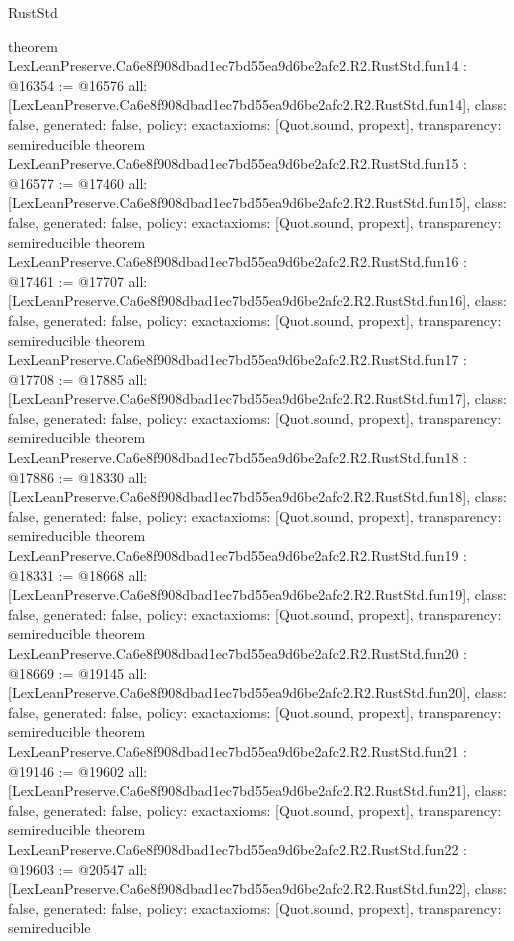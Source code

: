 \begin{lexlean}{RustStd}
\begin{coremodule}
{}
theorem LexLeanPreserve.Ca6e8f908dbad1ec7bd55ea9d6be2afc2.R2.RustStd.fun14 : @16354 := @16576 {
  all: [LexLeanPreserve.Ca6e8f908dbad1ec7bd55ea9d6be2afc2.R2.RustStd.fun14],
  class: false,
  generated: false,
  policy: exact{axioms: [Quot.sound, propext]},
  transparency: semireducible
}
theorem LexLeanPreserve.Ca6e8f908dbad1ec7bd55ea9d6be2afc2.R2.RustStd.fun15 : @16577 := @17460 {
  all: [LexLeanPreserve.Ca6e8f908dbad1ec7bd55ea9d6be2afc2.R2.RustStd.fun15],
  class: false,
  generated: false,
  policy: exact{axioms: [Quot.sound, propext]},
  transparency: semireducible
}
theorem LexLeanPreserve.Ca6e8f908dbad1ec7bd55ea9d6be2afc2.R2.RustStd.fun16 : @17461 := @17707 {
  all: [LexLeanPreserve.Ca6e8f908dbad1ec7bd55ea9d6be2afc2.R2.RustStd.fun16],
  class: false,
  generated: false,
  policy: exact{axioms: [Quot.sound, propext]},
  transparency: semireducible
}
theorem LexLeanPreserve.Ca6e8f908dbad1ec7bd55ea9d6be2afc2.R2.RustStd.fun17 : @17708 := @17885 {
  all: [LexLeanPreserve.Ca6e8f908dbad1ec7bd55ea9d6be2afc2.R2.RustStd.fun17],
  class: false,
  generated: false,
  policy: exact{axioms: [Quot.sound, propext]},
  transparency: semireducible
}
theorem LexLeanPreserve.Ca6e8f908dbad1ec7bd55ea9d6be2afc2.R2.RustStd.fun18 : @17886 := @18330 {
  all: [LexLeanPreserve.Ca6e8f908dbad1ec7bd55ea9d6be2afc2.R2.RustStd.fun18],
  class: false,
  generated: false,
  policy: exact{axioms: [Quot.sound, propext]},
  transparency: semireducible
}
theorem LexLeanPreserve.Ca6e8f908dbad1ec7bd55ea9d6be2afc2.R2.RustStd.fun19 : @18331 := @18668 {
  all: [LexLeanPreserve.Ca6e8f908dbad1ec7bd55ea9d6be2afc2.R2.RustStd.fun19],
  class: false,
  generated: false,
  policy: exact{axioms: [Quot.sound, propext]},
  transparency: semireducible
}
theorem LexLeanPreserve.Ca6e8f908dbad1ec7bd55ea9d6be2afc2.R2.RustStd.fun20 : @18669 := @19145 {
  all: [LexLeanPreserve.Ca6e8f908dbad1ec7bd55ea9d6be2afc2.R2.RustStd.fun20],
  class: false,
  generated: false,
  policy: exact{axioms: [Quot.sound, propext]},
  transparency: semireducible
}
theorem LexLeanPreserve.Ca6e8f908dbad1ec7bd55ea9d6be2afc2.R2.RustStd.fun21 : @19146 := @19602 {
  all: [LexLeanPreserve.Ca6e8f908dbad1ec7bd55ea9d6be2afc2.R2.RustStd.fun21],
  class: false,
  generated: false,
  policy: exact{axioms: [Quot.sound, propext]},
  transparency: semireducible
}
theorem LexLeanPreserve.Ca6e8f908dbad1ec7bd55ea9d6be2afc2.R2.RustStd.fun22 : @19603 := @20547 {
  all: [LexLeanPreserve.Ca6e8f908dbad1ec7bd55ea9d6be2afc2.R2.RustStd.fun22],
  class: false,
  generated: false,
  policy: exact{axioms: [Quot.sound, propext]},
  transparency: semireducible
}
\end{coremodule}
\end{lexlean}
